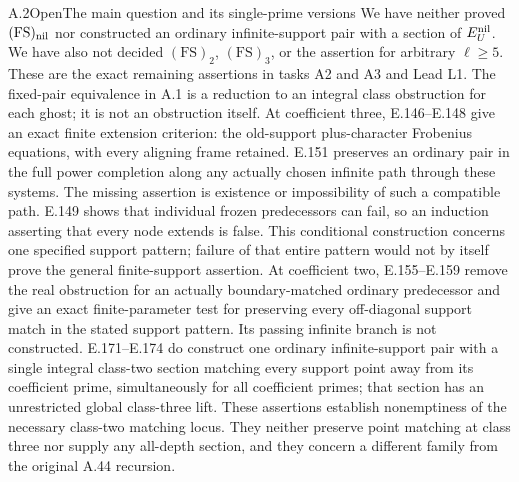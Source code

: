 \begin{result}{A.2}{Open}{The main question and its single-prime versions}
We have neither proved \((\mathrm{FS})_{\rm nil}\) nor constructed
an ordinary infinite-support pair with a section of \(E_U^{\rm nil}\).
We have also not decided \((\mathrm{FS})_2\), \((\mathrm{FS})_3\),
or the assertion for arbitrary \(\ell\ge5\).
These are the exact remaining assertions in tasks A2 and A3 and Lead L1.
The fixed-pair equivalence in A.1 is a reduction to an integral class
obstruction for each ghost; it is not an obstruction itself.
At coefficient three, E.146--E.148 give an exact finite extension
criterion: the old-support plus-character Frobenius equations, with
every aligning frame retained. E.151 preserves an ordinary pair in
the full power completion along any actually chosen infinite path
through these systems. The missing assertion is existence or
impossibility of such a compatible path. E.149 shows that individual
frozen predecessors can fail, so an induction asserting that every
node extends is false. This conditional construction concerns one
specified support pattern; failure of that entire pattern would not
by itself prove the general finite-support assertion.
At coefficient two, E.155--E.159 remove the real obstruction for
an actually boundary-matched ordinary predecessor and give an exact
finite-parameter test for preserving every off-diagonal support match
in the stated support pattern. Its passing infinite branch is not
constructed. E.171--E.174 do construct one ordinary infinite-support
pair with a single integral class-two section matching every support
point away from its coefficient prime, simultaneously for all
coefficient primes; that section has an unrestricted global class-three
lift. These assertions establish nonemptiness of the necessary
class-two matching locus. They neither preserve point matching at
class three nor supply any all-depth section, and they concern a
different family from the original A.44 recursion.
\end{result}

